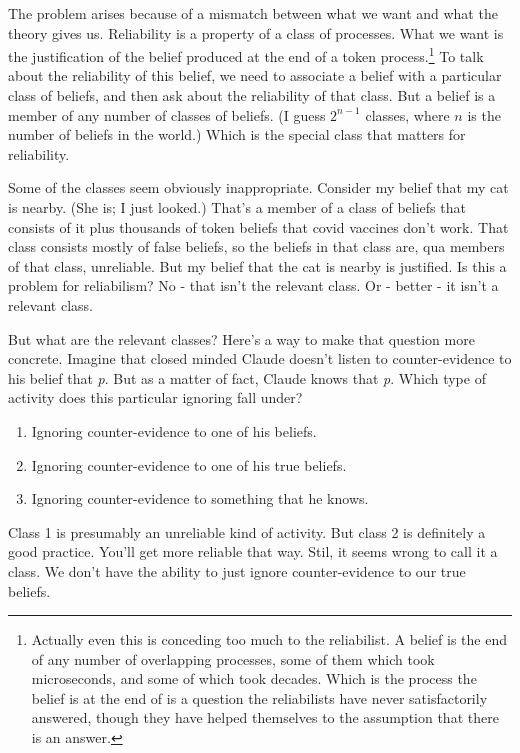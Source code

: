 \documentclass[
]{article}
\providecommand{\tightlist}{%
  \setlength{\itemsep}{0pt}\setlength{\parskip}{0pt}}
\begin{document}
The problem arises because of a mismatch between what we want and what
the theory gives us. Reliability is a property of a class of processes.
What we want is the justification of the belief produced at the end of a
token process.\footnote{Actually even this is conceding too much to the
  reliabilist. A belief is the end of any number of overlapping
  processes, some of them which took microseconds, and some of which
  took decades. Which is the process the belief is at the end of is a
  question the reliabilists have never satisfactorily answered, though
  they have helped themselves to the assumption that there is an answer.}
To talk about the reliability of this belief, we need to associate a
belief with a particular class of beliefs, and then ask about the
reliability of that class. But a belief is a member of any number of
classes of beliefs. (I guess \(2^{n-1}\) classes, where \(n\) is the
number of beliefs in the world.) Which is the special class that matters
for reliability.

Some of the classes seem obviously inappropriate. Consider my belief
that my cat is nearby. (She is; I just looked.) That's a member of a
class of beliefs that consists of it plus thousands of token beliefs
that covid vaccines don't work. That class consists mostly of false
beliefs, so the beliefs in that class are, qua members of that class,
unreliable. But my belief that the cat is nearby is justified. Is this a
problem for reliabilism? No - that isn't the relevant class. Or - better
- it isn't a relevant class.

But what are the relevant classes? Here's a way to make that question
more concrete. Imagine that closed minded Claude doesn't listen to
counter-evidence to his belief that \emph{p}. But as a matter of fact,
Claude knows that \emph{p}. Which type of activity does this particular
ignoring fall under?

\begin{enumerate}
\def\labelenumi{\arabic{enumi}.}
\tightlist
\item
  Ignoring counter-evidence to one of his beliefs.
\item
  Ignoring counter-evidence to one of his true beliefs.
\item
  Ignoring counter-evidence to something that he knows.
\end{enumerate}

Class 1 is presumably an unreliable kind of activity. But class 2 is
definitely a good practice. You'll get more reliable that way. Stil, it
seems wrong to call it a class. We don't have the ability to just ignore
counter-evidence to our true beliefs.
\end{document}
